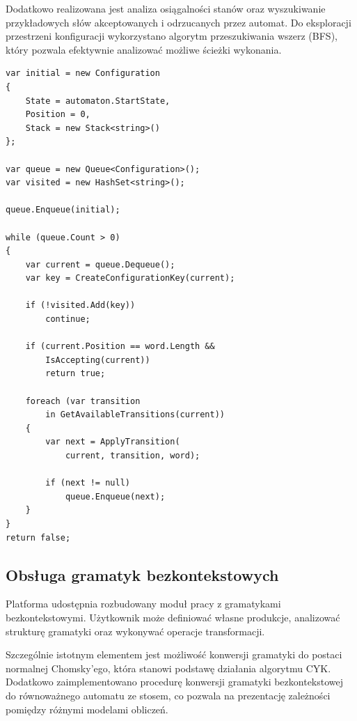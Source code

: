 \documentclass[12pt]{article}
\begin{document}
Dodatkowo realizowana jest analiza osiągalności stanów oraz wyszukiwanie przykładowych słów akceptowanych i odrzucanych przez automat. Do eksploracji przestrzeni konfiguracji wykorzystano algorytm przeszukiwania wszerz (BFS), który pozwala efektywnie analizować możliwe ścieżki wykonania.

\clearpage
\begin{lstlisting}[language={[Sharp]C},
caption={Symulacja automatu ze stosem z wykorzystaniem BFS},
label={lst:pda-bfs}]
var initial = new Configuration
{
    State = automaton.StartState,
    Position = 0,
    Stack = new Stack<string>()
};

var queue = new Queue<Configuration>();
var visited = new HashSet<string>();

queue.Enqueue(initial);

while (queue.Count > 0)
{
    var current = queue.Dequeue();
    var key = CreateConfigurationKey(current);

    if (!visited.Add(key))
        continue;

    if (current.Position == word.Length &&
        IsAccepting(current))
        return true;

    foreach (var transition
        in GetAvailableTransitions(current))
    {
        var next = ApplyTransition(
            current, transition, word);

        if (next != null)
            queue.Enqueue(next);
    }
}
return false;
\end{lstlisting}

\clearpage
\subsection{Obsługa gramatyk bezkontekstowych}

Platforma udostępnia rozbudowany moduł pracy z gramatykami bezkontekstowymi. Użytkownik może definiować własne produkcje, analizować strukturę gramatyki oraz wykonywać operacje transformacji.

Szczególnie istotnym elementem jest możliwość konwersji gramatyki do postaci normalnej Chomsky'ego, która stanowi podstawę działania algorytmu CYK. Dodatkowo zaimplementowano procedurę konwersji gramatyki bezkontekstowej do równoważnego automatu ze stosem, co pozwala na prezentację zależności pomiędzy różnymi modelami obliczeń.

\clearpage
\end{document}
